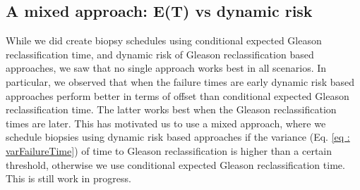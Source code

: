 \subsection{A mixed approach: E(T) vs dynamic risk}
While we did create biopsy schedules using conditional expected Gleason reclassification time, and dynamic risk of Gleason reclassification based approaches, we saw that no single approach works best in all scenarios. In particular, we observed that when the failure times are early dynamic risk based approaches perform better in terms of offset than conditional expected Gleason reclassification time. The latter works best when the Gleason reclassification times are later. This has motivated us to use a mixed approach, where we schedule biopsies using dynamic risk based approaches if the variance (Eq. \ref{eq : varFailureTime}) of time to Gleason reclassification is higher than a certain threshold, otherwise we use conditional expected Gleason reclassification time. This is still work in progress.